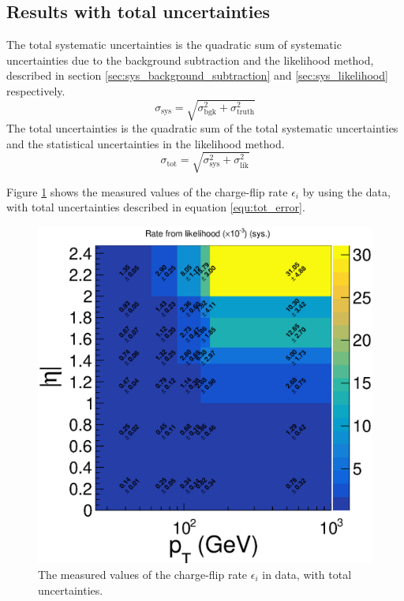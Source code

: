 \subsection{Results with total uncertainties}
\label{sec:charge_flip_results_stat}
The total systematic uncertainties is the quadratic sum of systematic uncertainties due to the background subtraction and the likelihood method, described in section \ref{sec:sys_background_subtraction} and \ref{sec:sys_likelihood} respectively.
\begin{equation}
\sigma_{\text{sys}} = \sqrt{\sigma_{\text{bgk}} ^2+ \sigma_{\text{truth}} ^2}
\end{equation}
The total uncertainties is the quadratic sum of the total systematic uncertainties and the statistical uncertainties in the likelihood method.
\begin{equation}
\sigma_{\text{tot}} = \sqrt{\sigma_{\text{sys}} ^2 + \sigma_{\text{lik}} ^2}
\label{equ:tot_error}
\end{equation}

Figure \ref{fig:charge_flip_data_tot} shows the measured values of the charge-flip rate $\epsilon_i$ by using the data, with total uncertainties described in equation \ref{equ:tot_error}.

\begin{figure}
\centering
\includegraphics[width=\textwidth]{data/plot/charge_flip/FitPlots/data_cf_rate_tot.eps}
\caption{The measured values of the charge-flip rate $\epsilon_i$ in data, with total uncertainties.}
\label{fig:charge_flip_data_tot}
\end{figure}

